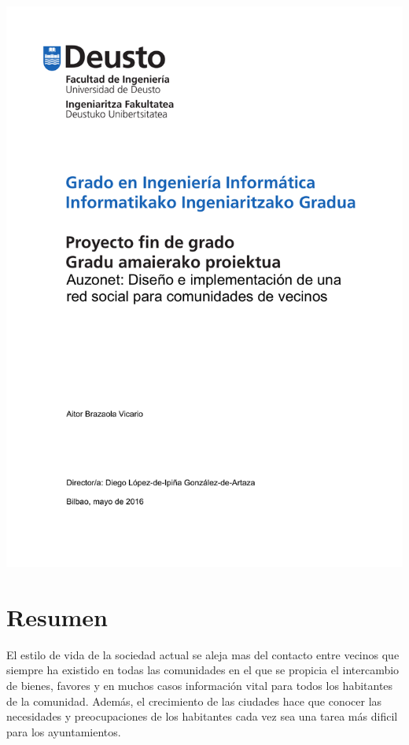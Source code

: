 \documentclass{DeustoFDP}
\begin{document}
\frontmatter
\pagestyle{plain}

\begin{titlepage}
  \includegraphics{fig/portada}
  \restoregeometry
\end{titlepage}
\cleardoublepage


\chapter*{Resumen}
El estilo de vida de la sociedad actual se aleja mas del contacto entre vecinos
que siempre ha existido en todas las comunidades en el que se propicia el
intercambio de bienes, favores y en muchos casos información vital para todos
los habitantes de la comunidad. Además, el crecimiento de las ciudades hace
que conocer las necesidades y preocupaciones de los habitantes cada vez sea una
tarea más dificil para los ayuntamientos.
\end{document}
